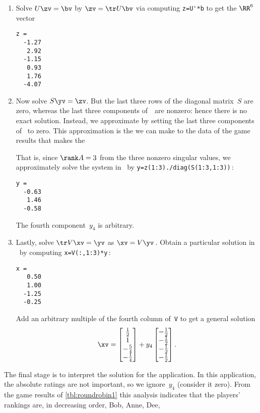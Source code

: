 \begin{example}
\begin{solution}
\begin{enumerate}
\item Solve \(U\zv=\bv\) by  \(\zv=\tr U\bv\) via computing \verb|z=U'*b| to get the \(\RR^6\) vector
\begin{verbatim}
z =
  -1.27
   2.92
  -1.15
   0.93
   1.76
  -4.07
\end{verbatim}

\item Now solve \(S\yv=\zv\).
But the last three rows of the diagonal matrix~\(S\) are zero, whereas the last three components of~\zv\ are nonzero: hence there is no exact solution. 
Instead, we approximate by setting the last three components of \zv\ to zero.
This approximation is the \emph{} we can make to the data of the game results that makes the 

That is, since \(\rank A=3\) from the three nonzero singular values,  we approximately solve the system in \script\ by \verb|y=z(1:3)./diag(S(1:3,1:3))|\,:
\begin{verbatim}
y =
  -0.63
   1.46
  -0.58
\end{verbatim}
The fourth component~\(y_4\) is arbitrary.

\item Lastly, solve \(\tr V\xv=\yv\) as \(\xv=V\yv\)\,. 
Obtain a particular solution in \script\ by computing \verb|x=V(:,1:3)*y|\,:
\begin{verbatim}
x =
   0.50
   1.00
  -1.25
  -0.25
\end{verbatim}
Add an arbitrary multiple of the fourth column of~\verb|V| to get a general solution
\begin{equation*}
\xv=\begin{bmatrix} \frac12\\1\\-\frac54\\-\frac14 \end{bmatrix}
+y_4\begin{bmatrix} -\frac12\\ -\frac12\\ -\frac12\\ -\frac12 \end{bmatrix}.
\end{equation*}
\end{enumerate}
The final stage is to interpret the solution for the application.
In this application, the absolute ratings are not important, so we ignore~\(y_4\) (consider it zero).  
From the game results of \cref{tbl:roundrobin1} this analysis indicates that the players' rankings are, in decreasing order, Bob, Anne, Dee, 
\end{solution}
\end{example}



